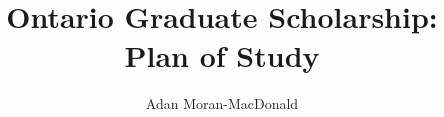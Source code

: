 \documentclass[a4paper,12pt]{article}
\begin{document}
\title{Ontario Graduate Scholarship: Plan of Study}
\author{Adan Moran-MacDonald}
\date{}
\maketitle


\cite{hybrid_zero_dynamics_bipedal_nhvcs}
\printbibliography
\end{document}
